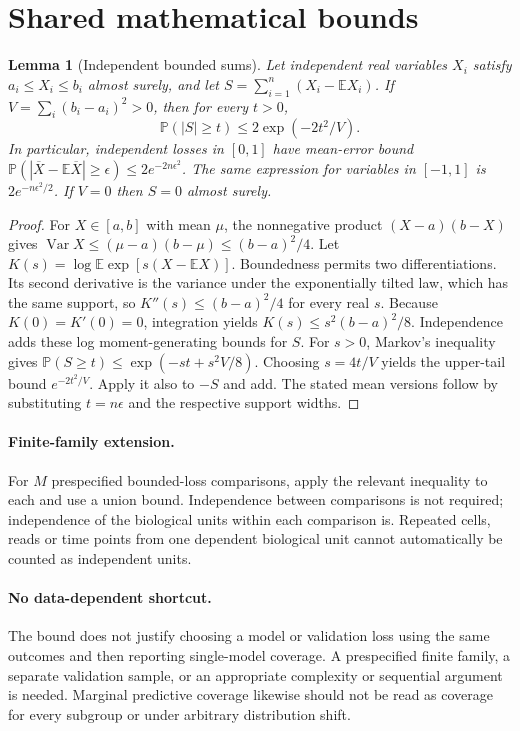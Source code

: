 \documentclass[11pt]{article}
\newcommand{\E}{\mathbb E}
\newcommand{\Prob}{\mathbb P}
\DeclareMathOperator{\Var}{Var}
\providecommand{\E}{\mathbb E}
\providecommand{\Prob}{\mathbb P}
\providecommand{\Var}{\operatorname{Var}}
\newtheorem{sharedlemma}{Lemma}[section]
\begin{document}
\section{Shared mathematical bounds}\label{app:bounds}
\begin{sharedlemma}[Independent bounded sums]\label{lem:bounded}
Let independent real variables $X_i$ satisfy $a_i\leq X_i\leq b_i$ almost surely,
and let $S=\sum_{i=1}^n(X_i-\E X_i)$. If
$V=\sum_i(b_i-a_i)^2>0$, then for every $t>0$,
\[
 \Prob(|S|\geq t)\leq 2\exp(-2t^2/V).
\]
In particular, independent losses in $[0,1]$ have mean-error bound
$\Prob(|\overline X-\E\overline X|\geq\epsilon)
\leq2e^{-2n\epsilon^2}$. The same expression for variables in $[-1,1]$
is $2e^{-n\epsilon^2/2}$. If $V=0$ then $S=0$ almost surely.
\end{sharedlemma}
\begin{proof}
For $X\in[a,b]$ with mean $\mu$, the nonnegative product
$(X-a)(b-X)$ gives
$\Var X\leq(\mu-a)(b-\mu)\leq(b-a)^2/4$.
Let $K(s)=\log\E\exp[s(X-\E X)]$.
Boundedness permits two differentiations. Its second derivative is the variance
under the exponentially tilted law, which has the same support, so
$K''(s)\leq(b-a)^2/4$ for every real $s$.
Because $K(0)=K'(0)=0$, integration yields
$K(s)\leq s^2(b-a)^2/8$.
Independence adds these log moment-generating bounds for $S$.
For $s>0$, Markov's inequality gives
$\Prob(S\geq t)\leq\exp(-st+s^2V/8)$.
Choosing $s=4t/V$ yields the upper-tail bound $e^{-2t^2/V}$.
Apply it also to $-S$ and add. The stated mean versions follow by substituting
$t=n\epsilon$ and the respective support widths.
\end{proof}

\paragraph{Finite-family extension.}
For $M$ prespecified bounded-loss comparisons, apply the relevant inequality to
each and use a union bound. Independence between comparisons is not required;
independence of the biological units within each comparison is. Repeated cells,
reads or time points from one dependent biological unit cannot automatically be
counted as independent units.

\paragraph{No data-dependent shortcut.}
The bound does not justify choosing a model or validation loss using the same
outcomes and then reporting single-model coverage. A prespecified finite family,
a separate validation sample, or an appropriate complexity or sequential argument
is needed. Marginal predictive coverage likewise should not be read as coverage
for every subgroup or under arbitrary distribution shift.
\end{document}
